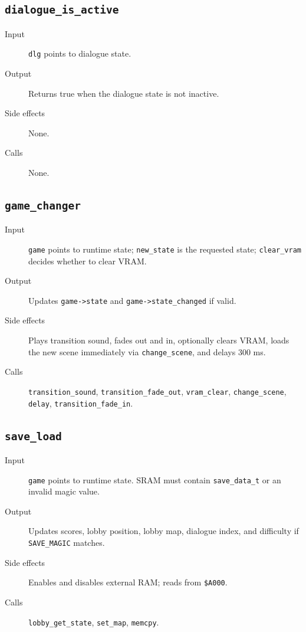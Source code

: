 \subsection*{\texttt{dialogue\_is\_active}}
\begin{description}
  \item[Input] \texttt{dlg} points to dialogue state.
  \item[Output] Returns true when the dialogue state is not inactive.
  \item[Side effects] None.
  \item[Calls] None.
\end{description}

\subsection*{\texttt{game\_changer}}
\begin{description}
  \item[Input] \texttt{game} points to runtime state; \texttt{new\_state} is the requested state; \texttt{clear\_vram} decides whether to clear VRAM.
  \item[Output] Updates \texttt{game->state} and \texttt{game->state\_changed} if valid.
  \item[Side effects] Plays transition sound, fades out and in, optionally clears VRAM, loads the new scene immediately via \texttt{change\_scene}, and delays 300 ms.
  \item[Calls] \texttt{transition\_sound}, \texttt{transition\_fade\_out}, \texttt{vram\_clear}, \texttt{change\_scene}, \texttt{delay}, \texttt{transition\_fade\_in}.
\end{description}

\subsection*{\texttt{save\_load}}
\begin{description}
  \item[Input] \texttt{game} points to runtime state. SRAM must contain \texttt{save\_data\_t} or an invalid magic value.
  \item[Output] Updates scores, lobby position, lobby map, dialogue index, and difficulty if \texttt{SAVE\_MAGIC} matches.
  \item[Side effects] Enables and disables external RAM; reads from \texttt{\$A000}.
  \item[Calls] \texttt{lobby\_get\_state}, \texttt{set\_map}, \texttt{memcpy}.
\end{description}

